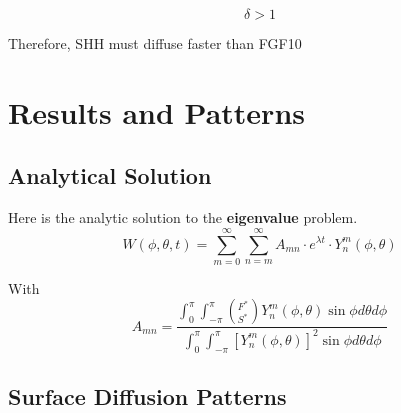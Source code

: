 \documentclass{beamer}
\begin{document}
            \begin{frame}{\insertsubsectionhead}
            
                \vspace{-5cm}
                {\fontsize{90}{100}\selectfont 
                $$\delta > 1 $$}
                
                \vspace{1cm}
                \centering
                Therefore, SHH must diffuse faster than FGF10
                
            \end{frame}
            
    \section[Results]{Results and Patterns}
    
        \subsection{Analytical Solution}
    
            \begin{frame}{\insertsubsectionhead}
            
                \vfill
                
                Here is the analytic solution to the \textbf{eigenvalue} problem.
                \vfill
                {\Large
                $$W(\phi,\theta,t)=\sum_{m=0}^\infty \sum_{n=m}^\infty A_{mn}\cdot e^{\lambda t}\cdot Y_n^m(\phi,\theta)$$}
                
                \vfill \centering
                With 
                \vfill
                {\Large
                $$A_{mn}=\frac{\int_0^\pi\int_{-\pi}^\pi \left(_{S^*}^{F^*}\right)Y_n^m(\phi,\theta)\sin{\phi}d\theta d\phi}{\int_0^\pi\int_{-\pi}^\pi [Y_n^m(\phi,\theta)]^2\sin{\phi}d\theta d\phi}$$}
                
                \vfill
                
                
            \end{frame}
        
        \subsection{Surface Diffusion Patterns}
        
\end{document}
